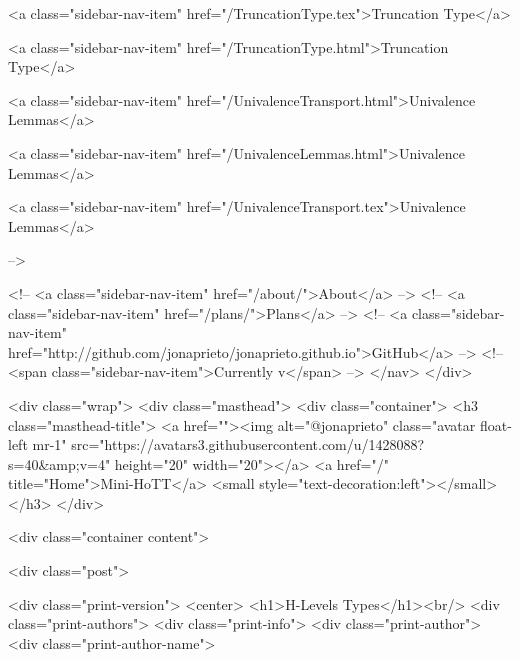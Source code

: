       
    
      
        
          <a class="sidebar-nav-item" href="/TruncationType.tex">Truncation Type</a>
        
      
    
      
        
          <a class="sidebar-nav-item" href="/TruncationType.html">Truncation Type</a>
        
      
    
      
        
          <a class="sidebar-nav-item" href="/UnivalenceTransport.html">Univalence Lemmas</a>
        
      
    
      
        
          <a class="sidebar-nav-item" href="/UnivalenceLemmas.html">Univalence Lemmas</a>
        
      
    
      
        
          <a class="sidebar-nav-item" href="/UnivalenceTransport.tex">Univalence Lemmas</a>
        
      
     -->

    <!-- <a class="sidebar-nav-item" href="/about/">About</a> -->
    <!-- <a class="sidebar-nav-item" href="/plans/">Plans</a> -->
    <!-- <a class="sidebar-nav-item" href="http://github.com/jonaprieto/jonaprieto.github.io">GitHub</a> -->
    <!-- <span class="sidebar-nav-item">Currently v</span> -->
  </nav>
</div>

    <div class="wrap">
      <div class="masthead">
        <div class="container">
          <h3 class="masthead-title">
            <a href=""><img alt="@jonaprieto" class="avatar float-left mr-1" src="https://avatars3.githubusercontent.com/u/1428088?s=40&amp;v=4" height="20" width="20"></a>
            <a href="/" title="Home">Mini-HoTT</a>
            <small style="text-decoration:left"></small>
          </h3>
        </div>
      
      <div class="container content">
        







<div class="post">

  <div class="print-version">
    <center>
      <h1>H-Levels Types</h1><br/>
        <div class="print-authors">
          <div class="print-info">
            <div class="print-author">
              <div class="print-author-name">
                

